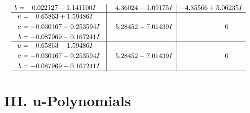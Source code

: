 \documentclass[1p]{elsarticle_modified}
\theoremstyle{definition}
\begin{document}
$$\begin{array}{c|c|c}
\begin{aligned}
b &= \phantom{-}0.022127 - 1.141100 I\end{aligned}
 & \phantom{-}4.36024 - 1.09175 I & -4.35566 + 5.06235 I \\ \hline\begin{aligned}
u &= \phantom{-}0.65863 + 1.59486 I \\
a &= -0.030167 - 0.253594 I \\
b &= -0.087969 - 0.167241 I\end{aligned}
 & \phantom{-}5.28452 + 7.01439 I & \phantom{-0.000000 } 0 \\ \hline\begin{aligned}
u &= \phantom{-}0.65863 - 1.59486 I \\
a &= -0.030167 + 0.253594 I \\
b &= -0.087969 + 0.167241 I\end{aligned}
 & \phantom{-}5.28452 - 7.01439 I & \phantom{-0.000000 } 0\\
 \hline 
 \end{array}$$\newpage
\newpage\renewcommand{\arraystretch}{1}
\centering \section*{ III. u-Polynomials}
\end{document}
